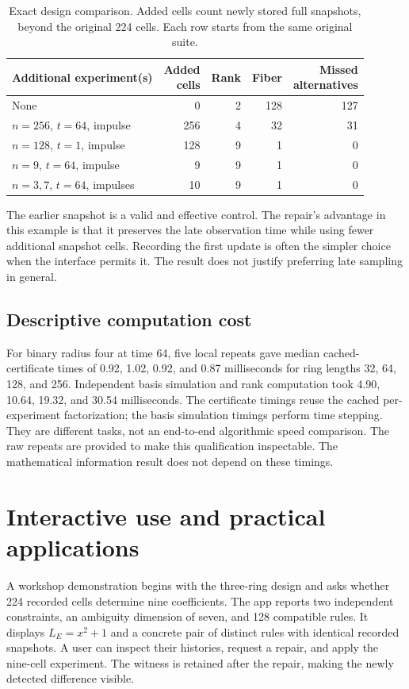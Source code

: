 \documentclass{ijuc}
\begin{document}
\begin{table}[t]
\centering\small
\caption{Exact design comparison. Added cells count newly stored full snapshots, beyond the original 224 cells. Each row starts from the same original suite.}
\label{tab:repair}
\begin{tabular}{@{}p{.37\linewidth}rrrr@{}}
\toprule
Additional experiment(s) & \shortstack{Added\\cells} & Rank & Fiber & \shortstack{Missed\\alternatives}\\\midrule
None & 0 & 2 & 128 & 127\\
$n=256$, $t=64$, impulse & 256 & 4 & 32 & 31\\
$n=128$, $t=1$, impulse & 128 & 9 & 1 & 0\\
$n=9$, $t=64$, impulse & 9 & 9 & 1 & 0\\
$n=3,7$, $t=64$, impulses & 10 & 9 & 1 & 0\\\bottomrule
\end{tabular}
\end{table}
The earlier snapshot is a valid and effective control. The repair's advantage in this example is that it preserves the late observation time while using fewer additional snapshot cells. Recording the first update is often the simpler choice when the interface permits it. The result does not justify preferring late sampling in general.

\subsection{Descriptive computation cost}
For binary radius four at time 64, five local repeats gave median cached-certificate times of 0.92, 1.02, 0.92, and 0.87 milliseconds for ring lengths 32, 64, 128, and 256. Independent basis simulation and rank computation took 4.90, 10.64, 19.32, and 30.54 milliseconds. The certificate timings reuse the cached per-experiment factorization; the basis simulation timings perform time stepping. They are different tasks, not an end-to-end algorithmic speed comparison. The raw repeats are provided to make this qualification inspectable. The mathematical information result does not depend on these timings.

\section{Interactive use and practical applications}
A workshop demonstration begins with the three-ring design and asks whether 224 recorded cells determine nine coefficients. The app reports two independent constraints, an ambiguity dimension of seven, and 128 compatible rules. It displays $L_E=x^2+1$ and a concrete pair of distinct rules with identical recorded snapshots. A user can inspect their histories, request a repair, and apply the nine-cell experiment. The witness is retained after the repair, making the newly detected difference visible.
\end{document}
